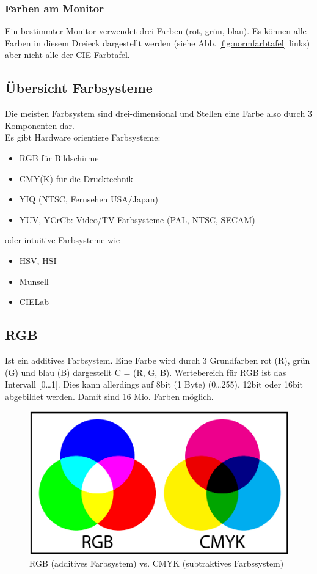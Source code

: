 \subsubsection{Farben am Monitor}
Ein bestimmter Monitor verwendet drei Farben (rot, grün, blau). Es können alle Farben in diesem Dreieck dargestellt werden (siehe Abb. \ref{fig:normfarbtafel} links) aber nicht alle der CIE Farbtafel. 


\subsection{Übersicht Farbsysteme}
Die meisten Farbsystem sind drei-dimensional und Stellen eine Farbe also durch 3 Komponenten dar.\\
Es gibt Hardware orientiere Farbsysteme:
\begin{itemize}[leftmargin=1cm]
    \item RGB für Bildschirme
    \item CMY(K) für die Drucktechnik
    \item YIQ (NTSC, Fernsehen USA/Japan)
    \item YUV, YCrCb: Video/TV-Farbsysteme (PAL, NTSC, SECAM)
\end{itemize}
\noindent
oder intuitive Farbsysteme wie
\begin{itemize}[leftmargin=1cm]
    \item HSV, HSI
    \item Munsell
    \item CIELab
\end{itemize}




\subsection{RGB} 
Ist ein additives Farbsystem. Eine Farbe wird durch 3 Grundfarben rot (R), grün (G) und blau (B) dargestellt C = (R, G, B).
Wertebereich für RGB ist das Intervall [0\dots1]. Dies kann allerdings auf 8bit (1 Byte) (0\dots255), 12bit oder 16bit abgebildet werden. Damit sind 16 Mio. Farben möglich.
\begin{figure}[!ht]
\centering
\includegraphics[width=0.7\linewidth]{fig/RGBvCMYK}
\caption{RGB (additives Farbsystem) vs. CMYK (subtraktives Farbssystem)}
\label{fig:rgbundcmyk}
\end{figure}

